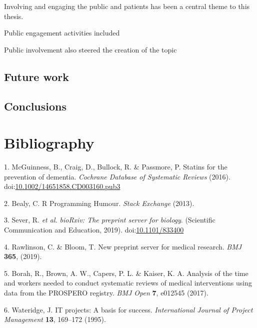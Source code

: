 \documentclass[a4paper, twoside]{templates/ociamthesis}
\begin{document}
Involving and engaging the public and patients has been a central theme to this thesis.

Public engagement activities included

Public involvement also steered the creation of the topic

\hypertarget{future-work}{%
\section{Future work}\label{future-work}}

\hypertarget{conclusions}{%
\section{Conclusions}\label{conclusions}}

\hypertarget{bibliography}{%
\chapter{Bibliography}\label{bibliography}}

\hypertarget{refs}{}
\leavevmode\hypertarget{ref-mcguinness2016b}{}%
1. McGuinness, B., Craig, D., Bullock, R. \& Passmore, P. Statins for the prevention of dementia. \emph{Cochrane Database of Systematic Reviews} (2016). doi:\href{https://doi.org/10.1002/14651858.CD003160.pub3}{10.1002/14651858.CD003160.pub3}

\leavevmode\hypertarget{ref-bealy2013}{}%
2. Bealy, C. R Programming Humour. \emph{Stack Exchange} (2013).

\leavevmode\hypertarget{ref-sever2019}{}%
3. Sever, R. \emph{et al.} \emph{bioRxiv: The preprint server for biology}. (Scientific Communication and Education, 2019). doi:\href{https://doi.org/10.1101/833400}{10.1101/833400}

\leavevmode\hypertarget{ref-rawlinson2019}{}%
4. Rawlinson, C. \& Bloom, T. New preprint server for medical research. \emph{BMJ} \textbf{365}, (2019).

\leavevmode\hypertarget{ref-borah2017}{}%
5. Borah, R., Brown, A. W., Capers, P. L. \& Kaiser, K. A. Analysis of the time and workers needed to conduct systematic reviews of medical interventions using data from the PROSPERO registry. \emph{BMJ Open} \textbf{7}, e012545 (2017).

\leavevmode\hypertarget{ref-wateridge1995}{}%
6. Wateridge, J. IT projects: A basis for success. \emph{International Journal of Project Management} \textbf{13}, 169--172 (1995).
\end{document}
